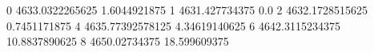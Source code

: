 0 4633.0322265625 1.6044921875
1 4631.427734375 0.0
2 4632.1728515625 0.7451171875
4 4635.77392578125 4.34619140625
6 4642.3115234375 10.8837890625
8 4650.02734375 18.599609375
